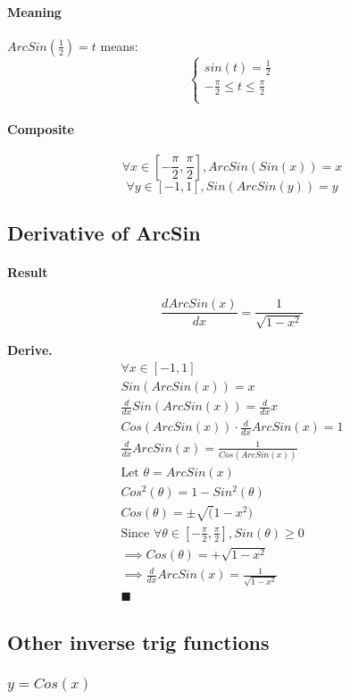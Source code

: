 \documentclass{article}
\begin{document}
	\paragraph{Meaning} $ArcSin(\frac{1}{2}) = t$ means:
	\[
	\begin{cases}
		sin(t) = \frac{1}{2} \\
		-\frac{\pi}{2} \leq t \leq \frac{\pi}{2} \\
	\end{cases}
	\]
	\paragraph{Composite}
	\[
		\forall x \in [-\frac{\pi}{2},\frac{\pi}{2}], ArcSin(Sin(x)) = x
	\]
	\[
		\forall y \in [-1, 1], Sin(ArcSin(y)) = y
	\]
	\subsection{Derivative of ArcSin}
	\paragraph{Result}
	\[
		\frac{dArcSin(x)}{dx} = \frac{1}{\sqrt{1-x^2}}
	\]

	\textbf{Derive.}
	\begin{align*}
		\forall x \in [-1,1] \\
		Sin(ArcSin(x)) = x \\
		\frac{d}{dx} Sin(ArcSin(x)) = \frac{d}{dx} x \\
		Cos(ArcSin(x)) \cdot \frac{d}{dx} ArcSin(x) = 1 \\
		\frac{d}{dx} ArcSin(x) = \frac{1}{Cos(ArcSin(x))} \\
		\text{Let }\theta = ArcSin(x) \\
		Cos^2(\theta ) = 1 - Sin^2(\theta) \\
		Cos(\theta) = \pm \sqrt(1 - x^2) \\
		\text{Since } \forall \theta \in [-\frac{\pi}{2}, \frac{\pi}{2}], Sin(\theta) \geq 0\\
		\implies Cos(\theta) = + \sqrt{1 - x^2} \\
		\implies \frac{d}{dx} ArcSin(x) = \frac{1}{\sqrt{1 - x^2}} \\
		\blacksquare
	\end{align*}
	\subsection{Other inverse trig functions}
	\subsubsection{$y = Cos(x)$}
\end{document}
